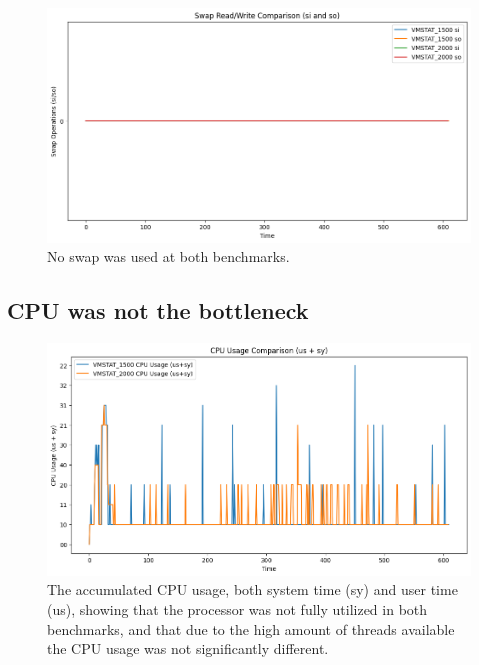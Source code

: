 \begin{figure}[H]
  \centering
  \includegraphics[width=\textwidth]{./plots/p1_swapio.png}
  \caption{No swap was used at both benchmarks.}
\end{figure}

\subsection{CPU was not the bottleneck}

\begin{figure}[H]
  \centering
  \includegraphics[width=\textwidth]{./plots/p1_cpu.png}
  \caption{The accumulated CPU usage, both system time (sy) and user time (us), showing that the processor was not fully utilized in both benchmarks, and that due to the high amount of threads available the CPU usage was not significantly different.}
\end{figure}
